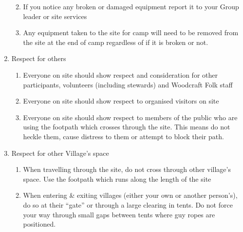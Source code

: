 \documentclass[a4paper, 11pt]{report}
\def\enumMarginIndentOne{4em}
\def\enumMarginIndentTwo{5em}
\begin{document}
\begin{enumerate}
\begin{enumerate}[leftmargin=\enumMarginIndentOne]
\begin{enumerate}[leftmargin=\enumMarginIndentTwo]
            \end{enumerate}
            \item If you notice any broken or damaged equipment report it to your Group leader or site services
            \item Any equipment taken to the site for camp will need to be removed from the site at the end of camp regardless of if it is broken or not.
        \end{enumerate}
        \item Respect for others
        \begin{enumerate}[leftmargin=\enumMarginIndentOne]
            \item Everyone on site should show respect and consideration for other participants, volunteers (including stewards) and Woodcraft Folk staff
            \item Everyone on site should show respect to organised visitors on site
            \item Everyone on site should show respect to members of the public who are using the footpath which crosses through the site. This means do not heckle them, cause distress to them or attempt to block their path.
        \end{enumerate}
        \item Respect for other Village's space
        \begin{enumerate}[leftmargin=\enumMarginIndentOne]
            \item When travelling through the site, do not cross through other village's space. Use the footpath which runs along the length of the site
            \item When entering \& exiting villages (either your own or another person's), do so at their ``gate'' or through a large clearing in tents. Do not force your way through small gaps between tents where guy ropes are positioned.
        \end{enumerate}
    \end{enumerate}
\end{document}
